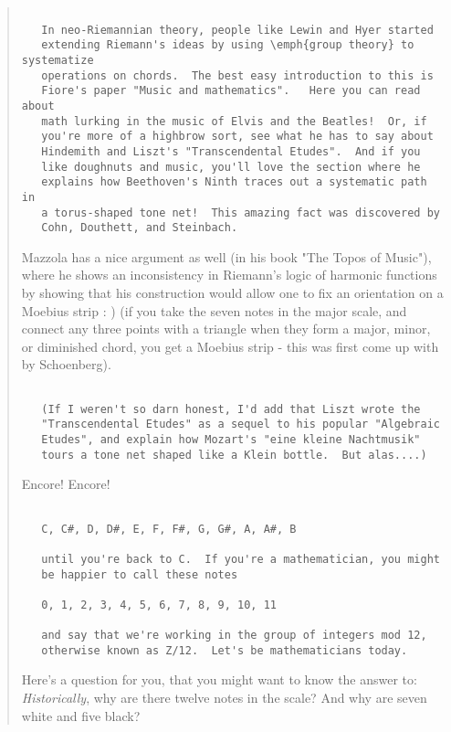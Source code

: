 \begin{quote}
\begin{verbatim}

   In neo-Riemannian theory, people like Lewin and Hyer started
   extending Riemann's ideas by using \emph{group theory} to systematize
   operations on chords.  The best easy introduction to this is
   Fiore's paper "Music and mathematics".   Here you can read about
   math lurking in the music of Elvis and the Beatles!  Or, if
   you're more of a highbrow sort, see what he has to say about
   Hindemith and Liszt's "Transcendental Etudes".  And if you
   like doughnuts and music, you'll love the section where he
   explains how Beethoven's Ninth traces out a systematic path in
   a torus-shaped tone net!  This amazing fact was discovered by
   Cohn, Douthett, and Steinbach.
\end{verbatim}
    

   Mazzola has a nice argument as well (in his book "The Topos of Music"),
   where he shows an inconsistency in Riemann's logic of harmonic
   functions by showing that his construction would allow one to fix an
   orientation on a Moebius strip : )  (if you take the seven notes in
   the major scale, and connect any three points with a triangle when they
   form a major, minor, or diminished chord, you get a Moebius strip - this
   was first come up with by Schoenberg).


\begin{verbatim}

   (If I weren't so darn honest, I'd add that Liszt wrote the
   "Transcendental Etudes" as a sequel to his popular "Algebraic
   Etudes", and explain how Mozart's "eine kleine Nachtmusik"
   tours a tone net shaped like a Klein bottle.  But alas....)
\end{verbatim}
    
   Encore! Encore!


\begin{verbatim}

   C, C#, D, D#, E, F, F#, G, G#, A, A#, B
  
   until you're back to C.  If you're a mathematician, you might
   be happier to call these notes
   
   0, 1, 2, 3, 4, 5, 6, 7, 8, 9, 10, 11
   
   and say that we're working in the group of integers mod 12,
   otherwise known as Z/12.  Let's be mathematicians today.
\end{verbatim}
    
   Here's a question for you, that you might want to know the answer to:
   \emph{Historically}, why are there twelve notes in the scale? And why are
   seven white and five black?


\end{quote}
